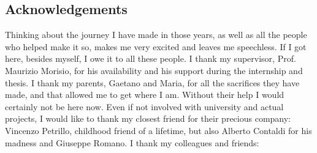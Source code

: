 \newpage
\pagestyle{empty}
\begin{spacing}{\myspacing}
\section*{Acknowledgements}

Thinking about the journey I have made in those years, as well as all the people who helped make it so, makes me very excited and leaves me speechless. If I got here, besides myself, I owe it to all these people.
\newline\newline \noindent I thank my supervisor, Prof. Maurizio Morisio, for his availability and his support during the internship and thesis.
\newline\newline \noindent I thank my parents, Gaetano and Maria, for all the sacrifices they have made, and that allowed me to get where I am. Without their help I would certainly not be here now.
\newline\newline \noindent Even if not involved with university and actual projects, I would like to thank my closest friend for their precious company: Vincenzo Petrillo, childhood friend of a lifetime, but also Alberto Contaldi for his madness and Giuseppe Romano.
\newline\newline \noindent I thank my colleagues and friends: 


\end{spacing}

